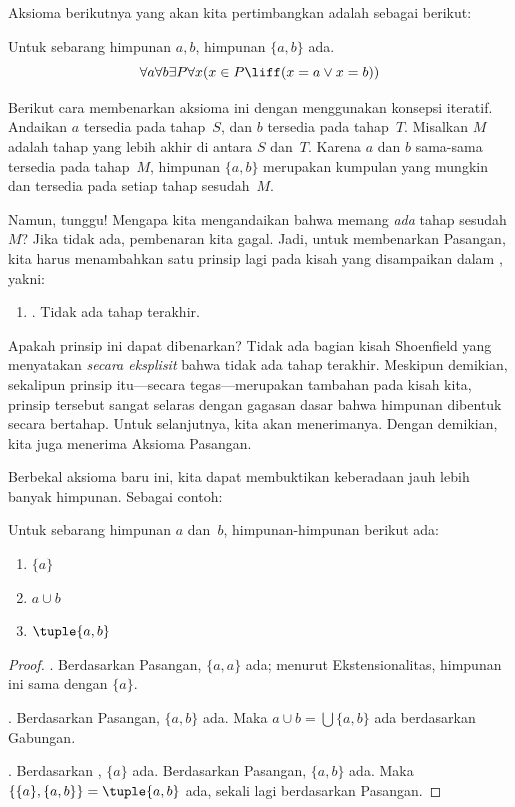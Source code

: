 \documentclass[../../../include/open-logic-section]{subfiles}
\begin{document}

Aksioma berikutnya yang akan kita pertimbangkan adalah sebagai berikut:

\begin{axiom}[Pasangan]
Untuk sebarang himpunan $a,b$, himpunan $\{a,b\}$ ada.
\[
	\forall a \forall b \exists P \forall x (x \in P \liff (x = a \lor x = b))
\]
\end{axiom}

Berikut cara membenarkan aksioma ini dengan menggunakan konsepsi iteratif.
Andaikan $a$ tersedia pada tahap~$S$, dan $b$ tersedia pada tahap~$T$.
Misalkan $M$ adalah tahap yang lebih akhir di antara $S$ dan~$T$. Karena $a$
dan $b$ sama-sama tersedia pada tahap~$M$, himpunan $\{a,b\}$ merupakan
kumpulan yang mungkin dan tersedia pada setiap tahap sesudah~$M$.

Namun, tunggu!{} Mengapa kita mengandaikan bahwa memang \emph{ada} tahap sesudah
$M$? Jika tidak ada, pembenaran kita gagal. Jadi, untuk membenarkan Pasangan,
kita harus menambahkan satu prinsip lagi pada kisah yang disampaikan dalam
, yakni:
\begin{enumerate}
	\item[] \stagessucc. Tidak ada tahap terakhir.
\end{enumerate}
Apakah prinsip ini dapat dibenarkan? Tidak ada bagian kisah Shoenfield yang
menyatakan \emph{secara eksplisit} bahwa tidak ada tahap terakhir. Meskipun
demikian, sekalipun prinsip itu---secara tegas---merupakan tambahan pada kisah
kita, prinsip tersebut sangat selaras dengan gagasan dasar bahwa himpunan
dibentuk secara bertahap. Untuk selanjutnya, kita akan menerimanya. Dengan
demikian, kita juga menerima Aksioma Pasangan.

Berbekal aksioma baru ini, kita dapat membuktikan keberadaan jauh lebih banyak
himpunan. Sebagai contoh:

\begin{prop}
Untuk sebarang himpunan $a$ dan~$b$, himpunan-himpunan berikut ada:
	\begin{enumerate}
		\item{} $\{a\}$
		\item{} $a \cup b$
		\item{} $\tuple{a,b}$
	\end{enumerate}
\end{prop}

\begin{proof}
. Berdasarkan Pasangan, $\{a,a\}$ ada; menurut
Ekstensionalitas, himpunan ini sama dengan $\{a\}$.

. Berdasarkan Pasangan, $\{a,b\}$ ada. Maka
$a\cup b=\bigcup\{a,b\}$ ada berdasarkan Gabungan.

. Berdasarkan , $\{a\}$ ada. Berdasarkan
Pasangan, $\{a,b\}$ ada. Maka
$\{\{a\},\{a,b\}\}=\tuple{a,b}$ ada, sekali lagi berdasarkan Pasangan.
\end{proof}
\end{document}

